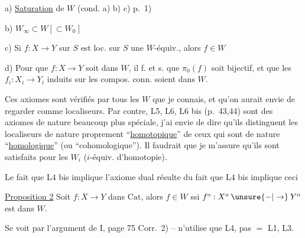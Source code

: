 \noindent\begin{minipage}{.035\linewidth}
\end{minipage}\begin{minipage}{.93\linewidth}
a) \uline{Saturation} de $W$ (cond. a) b) c) p.~1)

b) $W_\infty\subset W[\subset W_0]$

c) Si $f:X\longrightarrow Y$ sur $S$ est loc. sur $S$ une $W$-équiv., alors $f\in W$ 

d) Pour que $f:X\longrightarrow Y$ soit dans $W$, il f. et s. que $\pi_0(f)$ soit bijectif, et que les $f_i:X_i\longrightarrow Y_i$ induits sur les compos. conn. soient dans $W$.
\end{minipage}



 Ces axiomes sont vérifiés par tous les $W$ que je connais, et qu'on aurait envie de regarder comme localiseurs. Par contre, L5, L6, L6 bis (p.~43,44) sont des axiomes de nature beaucoup plus spéciale, j'ai envie de dire qu'ils distinguent les localiseurs de nature proprement ``\uline{homotopique}'' de ceux qui sont de nature ``\uline{homologique}'' (ou ``cohomologique''). Il faudrait que je m'assure qu'ils sont satisfaits pour les $W_i$ ($i$-équiv. d'homotopie).


Le fait que L4 bis  implique l'axiome dual résulte du fait  que L4 bis implique ceci

\uline{Proposition 2} Soit $f:X\longrightarrow Y$ dans $\mathrm{Cat}$, alors $f\in W$ ssi $f^o:X^o\mathbin{\unsure{-|\to}}Y^o$ est dans $W$.

Se voit par l'argument de I, page 75 Corr.~2) -- n'utilise que L4, pas $=$ L1, L3.

